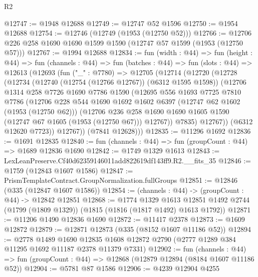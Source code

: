 \begin{lexlean}{R2}
\begin{coremodule}
@12747 := @1948 @12688
@12749 := @12747 @52 @1596
@12750 := @1954 @12688
@12754 := @12746 (@12749 (@1953 (@12750 @52)))
@12766 := @12706 @226 @258 @1690 @1690 @1599 @1590 (@12747 @57 @1599 (@1953 (@12750 @57)))
@12767 := @1994 @12688
@12834 := fun (width : @44) =>
  fun (height : @44) =>
  fun (channels : @44) =>
  fun (batches : @44) =>
  fun (slots : @44) =>
  @12613
    (@12693
      (fun ("_" : @7780) =>
      @12705
        (@12714
          (@12720
            (@12728
              (@12734
                (@12740 (@12754 (@12766 @12767)) (@6312 @1595 @1598))
                (@12706
                  @1314
                  @258
                  @7726
                  @1690
                  @7786
                  @1590
                  (@12695
                    @556
                    @1693
                    @7725
                    @7810
                    @7786
                    (@12706
                      @228
                      @544
                      @1690
                      @1692
                      @1602
                      @6397
                      (@12747 @62 @1602 (@1953 (@12750 @62)))
                      (@12706
                        @236
                        @258
                        @1690
                        @1690
                        @1605
                        @1590
                        (@12747 @67 @1605 (@1953 (@12750 @67)))
                        @12767))
                    @7835)
                  @12767))
              (@6312 @12620 @7723))
            @12767))
        (@7841 @12628)))
@12835 := @11296 @1692
@12836 := @1691 @12835
@12840 := fun (channels : @44) => fun (groupCount : @44) => @1689 @12836 @1690
@12842 := @1749 @1329 @1613
@12843 := LexLeanPreserve.Cf40d62359146011add822619df143ff9.R2.__fits_35
@12846 := @1759 (@12843 @1607 @1586)
@12847 := PrismTemplateContract.GroupNormalization.fullGroups
@12851 := @12846 (@335 (@12847 @1607 @1586))
@12854 := (channels : @44) -> (groupCount : @44) -> @12842 @12851
@12868 := @1774
    @1329
    @1613
    @12851
    @1492
    @2744
    (@1799 (@1809 @1329))
    (@1815 (@1816 (@1817 @1492) @1613 @1792))
@12871 := @11206 @1490 @12836 @1690
@12872 := @11417 @2378
@12873 := @1609 @12872
@12879 := @12871 @12873 (@335 (@8152 @1607 @11186 @52))
@12894 := @2778
    @1489
    @1690
    @12835
    @1608
    @12872
    @2790
    (@2777 @1289 @384 @11295 @1692 @11187 @2378 @11379 @7331)
@12902 := fun (channels : @44) =>
  fun (groupCount : @44) => @12868 (@12879 @12894 (@8184 @1607 @11186 @52))
@12904 := @5781 @87 @1586
@12906 := @4239 @12904 @4255

\end{coremodule}
\end{lexlean}
